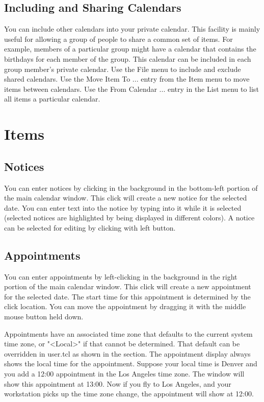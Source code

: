 \documentclass[a4paper,english]{article}
\begin{document}
    \subsection{Including and Sharing Calendars}
        You can include other calendars into your private
        calendar. This facility is mainly useful for allowing a group
        of people to share a common set of items. For example, members
        of a particular group might have a calendar that contains the
        birthdays for each member of the group. This calendar can be
        included in each group member's private calendar.  Use the
        File menu to include and exclude shared calendars.  Use the
        Move Item To ... entry from the Item menu to move items
        between calendars.  Use the From Calendar ... entry in the
        List menu to list all items a particular calendar.

\section{Items}
    \subsection{Notices}
        You can enter notices by clicking in the background in the
        bottom-left portion of the main calendar window. This click
        will create a new notice for the selected date.  You can enter
        text into the notice by typing into it while it is selected
        (selected notices are highlighted by being displayed in
        different colors).  A notice can be selected for editing by
        clicking with left button.

    \subsection{Appointments}
        You can enter appointments by left-clicking in the background
        in the right portion of the main calendar window.  This click
        will create a new appointment for the selected date. The start
        time for this appointment is determined by the click
        location. You can move the appointment by dragging it with the
        middle mouse button held down.

        Appointments have an associated time zone that defaults to the
        current system time zone, or "<Local>" if that cannot be
        determined. That default can be overridden in user.tcl as
        shown in the  section.
        The appointment display always shows the local
        time for the appointment. Suppose your local time is Denver
        and you add a 12:00 appointment in the Los Angeles time zone.
        The window will show this appointment at 13:00. Now if you fly to
        Los Angeles, and your workstation picks up the time zone
        change, the appointment will show at 12:00.
\end{document}
